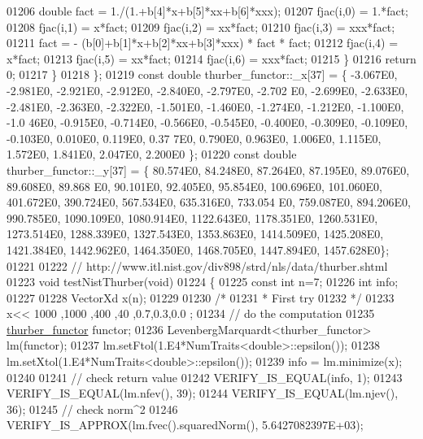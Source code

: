 \begin{DoxyCode}
01206             \textcolor{keywordtype}{double} fact = 1./(1.+b[4]*x+b[5]*xx+b[6]*xxx);
01207             fjac(i,0) = 1.*fact;
01208             fjac(i,1) = x*fact;
01209             fjac(i,2) = xx*fact;
01210             fjac(i,3) = xxx*fact;
01211             fact = - (b[0]+b[1]*x+b[2]*xx+b[3]*xxx) * fact * fact;
01212             fjac(i,4) = x*fact;
01213             fjac(i,5) = xx*fact;
01214             fjac(i,6) = xxx*fact;
01215         \}
01216         \textcolor{keywordflow}{return} 0;
01217     \}
01218 \};
01219 \textcolor{keyword}{const} \textcolor{keywordtype}{double} thurber\_functor::\_x[37] = \{ -3.067E0, -2.981E0, -2.921E0, -2.912E0, -2.840E0, -2.797E0, -2.702
      E0, -2.699E0, -2.633E0, -2.481E0, -2.363E0, -2.322E0, -1.501E0, -1.460E0, -1.274E0, -1.212E0, -1.100E0, -1.0
      46E0, -0.915E0, -0.714E0, -0.566E0, -0.545E0, -0.400E0, -0.309E0, -0.109E0, -0.103E0, 0.010E0, 0.119E0, 0.37
      7E0, 0.790E0, 0.963E0, 1.006E0, 1.115E0, 1.572E0, 1.841E0, 2.047E0, 2.200E0 \};
01220 \textcolor{keyword}{const} \textcolor{keywordtype}{double} thurber\_functor::\_y[37] = \{ 80.574E0, 84.248E0, 87.264E0, 87.195E0, 89.076E0, 89.608E0, 89.868
      E0, 90.101E0, 92.405E0, 95.854E0, 100.696E0, 101.060E0, 401.672E0, 390.724E0, 567.534E0, 635.316E0, 733.054
      E0, 759.087E0, 894.206E0, 990.785E0, 1090.109E0, 1080.914E0, 1122.643E0, 1178.351E0, 1260.531E0, 1273.514E0, 
      1288.339E0, 1327.543E0, 1353.863E0, 1414.509E0, 1425.208E0, 1421.384E0, 1442.962E0, 1464.350E0, 1468.705E0, 
      1447.894E0, 1457.628E0\};
01221 
01222 \textcolor{comment}{// http://www.itl.nist.gov/div898/strd/nls/data/thurber.shtml}
01223 \textcolor{keywordtype}{void} testNistThurber(\textcolor{keywordtype}{void})
01224 \{
01225   \textcolor{keyword}{const} \textcolor{keywordtype}{int} n=7;
01226   \textcolor{keywordtype}{int} info;
01227 
01228   VectorXd x(n);
01229 
01230   \textcolor{comment}{/*}
01231 \textcolor{comment}{   * First try}
01232 \textcolor{comment}{   */}
01233   x<< 1000 ,1000 ,400 ,40 ,0.7,0.3,0.0 ;
01234   \textcolor{comment}{// do the computation}
01235   \hyperlink{structthurber__functor}{thurber\_functor} functor;
01236   LevenbergMarquardt<thurber\_functor> lm(functor);
01237   lm.setFtol(1.E4*NumTraits<double>::epsilon());
01238   lm.setXtol(1.E4*NumTraits<double>::epsilon());
01239   info = lm.minimize(x);
01240 
01241   \textcolor{comment}{// check return value}
01242   VERIFY\_IS\_EQUAL(info, 1);
01243   VERIFY\_IS\_EQUAL(lm.nfev(), 39);
01244   VERIFY\_IS\_EQUAL(lm.njev(), 36);
01245   \textcolor{comment}{// check norm^2}
01246   VERIFY\_IS\_APPROX(lm.fvec().squaredNorm(), 5.6427082397E+03);

\end{DoxyCode}
